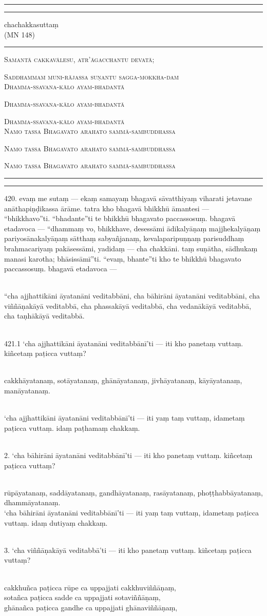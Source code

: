 \documentclass[9pt]{article}
\newcommand*{\titlePaliSuttaTitlePage}{\begingroup %
\newlength{\drop} %
\drop=0.1\textheight %

\rule{\textwidth}{1pt}\par %
\vspace{2pt}\vspace{-\baselineskip} %
\rule{\textwidth}{0.4pt}\par %

\vspace{\drop} %
\centering %

{\Huge chachakkasuttaṃ}\\[1\baselineskip] %
{\large (MN 148)}

\vspace{0.25\drop} %
\rule{0.3\textwidth}{0.4pt}\par %
\vspace{\drop} %

{\large\textsc{Samantā cakkavālesu, atr'āgacchantu devatā;}}\par
{\large\textsc{Saddhammaṁ muni-rājassa suṇantu sagga-mokkha-daṁ}}\\[2\baselineskip]


{\large\textsc{Dhamma-ssavana-kālo  ayam-bhadantā}}\par
{\large\textsc{Dhamma-ssavana-kālo  ayam-bhadantā}}\par
{\large\textsc{Dhamma-ssavana-kālo  ayam-bhadantā}}\\[2\baselineskip]


{\large \textsc{Namo tassa Bhagavato arahato sammā-sambuddhassa}}\par %
{\large \textsc{Namo tassa Bhagavato arahato sammā-sambuddhassa}}\par %
{\large \textsc{Namo tassa Bhagavato arahato sammā-sambuddhassa}}\par %
\vspace*{\drop} %

\rule{\textwidth}{0.4pt}\par %
\vspace{2pt}\vspace{-\baselineskip} %
\rule{\textwidth}{1pt}\par %
\pagebreak
\endgroup}
\begin{document}
\titlePaliSuttaTitlePage
 
420. evaṃ me sutaṃ — ekaṃ samayaṃ bhagavā sāvatthiyaṃ viharati jetavane anāthapiṇḍikassa ārāme. tatra kho bhagavā bhikkhū āmantesi —\\

“bhikkhavo”ti. “bhadante”ti te bhikkhū bhagavato paccassosuṃ. bhagavā etadavoca — “dhammaṃ vo, bhikkhave, desessāmi ādikalyāṇaṃ majjhekalyāṇaṃ pariyosānakalyāṇaṃ sātthaṃ sabyañjanaṃ, kevalaparipuṇṇaṃ parisuddhaṃ brahmacariyaṃ pakāsessāmi, yadidaṃ — cha chakkāni. taṃ suṇātha, sādhukaṃ manasi karotha; bhāsissāmī”ti. “evaṃ, bhante”ti kho te bhikkhū bhagavato paccassosuṃ. bhagavā etadavoca —\\\

“cha ajjhattikāni āyatanāni veditabbāni, cha bāhirāni āyatanāni veditabbāni, cha viññāṇakāyā veditabbā, cha phassakāyā veditabbā, cha vedanākāyā veditabbā, cha taṇhākāyā veditabbā.\\\

421.1 ‘cha ajjhattikāni āyatanāni veditabbānī’ti — iti kho panetaṃ vuttaṃ. kiñcetaṃ paṭicca vuttaṃ?\\\

cakkhāyatanaṃ, sotāyatanaṃ, ghānāyatanaṃ, jivhāyatanaṃ, kāyāyatanaṃ, manāyatanaṃ.\\\

‘cha ajjhattikāni āyatanāni veditabbānī’ti — iti yaṃ taṃ vuttaṃ, idametaṃ paṭicca vuttaṃ. idaṃ paṭhamaṃ chakkaṃ.\\\

2. ‘cha bāhirāni āyatanāni veditabbānī’ti — iti kho panetaṃ vuttaṃ. kiñcetaṃ paṭicca vuttaṃ?\\\

rūpāyatanaṃ, saddāyatanaṃ, gandhāyatanaṃ, rasāyatanaṃ, phoṭṭhabbāyatanaṃ, dhammāyatanaṃ.\\

‘cha bāhirāni āyatanāni veditabbānī’ti — iti yaṃ taṃ vuttaṃ, idametaṃ paṭicca vuttaṃ. idaṃ dutiyaṃ chakkaṃ.\\\

3. ‘cha viññāṇakāyā veditabbā’ti — iti kho panetaṃ vuttaṃ. kiñcetaṃ paṭicca vuttaṃ?\\\

cakkhuñca paṭicca rūpe ca uppajjati cakkhuviññāṇaṃ,\\

sotañca paṭicca sadde ca uppajjati sotaviññāṇaṃ,\\

ghānañca paṭicca gandhe ca uppajjati ghānaviññāṇaṃ,\\
\end{document}
